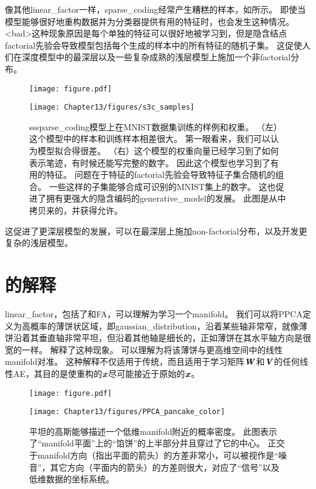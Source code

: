 像其他\gls{linear_factor}一样，\gls{sparse_coding}经常产生糟糕的样本，如所示。
即使当模型能够很好地重构数据并为分类器提供有用的特征时，也会发生这种情况。
<bad>这种现象原因是每个单独的特征可以很好地被学习到，但是隐含结点\gls{factorial}先验会导致模型包括每个生成的样本中的所有特征的随机子集。
这促使人们在深度模型中的最深层以及一些复杂成熟的浅层模型上施加一个非\gls{factorial}分布。

\begin{figure}[!htb]
\ifOpenSource
\centerline{\texttt{[image: figure.pdf]}}
\else
	\centerline{\texttt{[image: Chapter13/figures/s3c\_samples]}}
\fi
\caption{\gls{ss}\gls{sparse_coding}模型上在MNIST数据集训练的样例和权重。
	（左）这个模型中的样本和训练样本相差很大。
	第一眼看来，我们可以认为模型拟合得很差。
	（右）这个模型的权重向量已经学习到了如何表示笔迹，有时候还能写完整的数字。
	因此这个模型也学习到了有用的特征。
	问题在于特征的\gls{factorial}先验会导致特征子集合随机的组合。
	一些这样的子集能够合成可识别的MNIST集上的数字。
	这也促进了拥有更强大的隐含编码的\gls{generative_model}的发展。
	此图是从\citet{Goodfeli-et-al-TPAMI-Deep-PrePrint-2013-small}中拷贝来的，并获得允许。}
	\label{fig:s3c_samples}
\end{figure}

这促进了更深层模型的发展，可以在最深层上施加non-factorial分布，以及开发更复杂的浅层模型。


\section{的解释}
\label{sec:manifold_interpretation_of_pca}


\gls{linear_factor}，包括了和\gls{FA}，可以理解为学习一个\gls{manifold}\citep{hinton97modelling}。
我们可以将\gls{PPCA}定义为高概率的薄饼状区域，即\gls{gaussian_distribution}，沿着某些轴非常窄，就像薄饼沿着其垂直轴非常平坦，但沿着其他轴是细长的，正如薄饼在其水平轴方向是很宽的一样。
解释了这种现象。
可以理解为将该薄饼与更高维空间中的线性\gls{manifold}对准。
这种解释不仅适用于传统，而且适用于学习矩阵$\boldsymbol{\mathit{W}}$和$\boldsymbol{\mathit{V}}$的任何线性\gls{AE}，其目的是使重构的$\boldsymbol{\mathit{x}}$尽可能接近于原始的$\boldsymbol{\mathit{x}}$。

\begin{figure}[!htb]
\ifOpenSource
\centerline{\texttt{[image: figure.pdf]}}
\else
	\centerline{\texttt{[image: Chapter13/figures/PPCA\_pancake\_color]}}
\fi
	\caption{平坦的高斯能够描述一个低维\gls{manifold}附近的概率密度。
		此图表示了``\gls{manifold}平面''上的``馅饼''的上半部分并且穿过了它的中心。
		正交于\gls{manifold}方向（指出平面的箭头）的方差非常小，可以被视作是``噪音''，其它方向（平面内的箭头）的方差则很大，对应了``信号''以及低维数据的坐标系统。}
    \label{fig:PPCA_pancake}
\end{figure}


